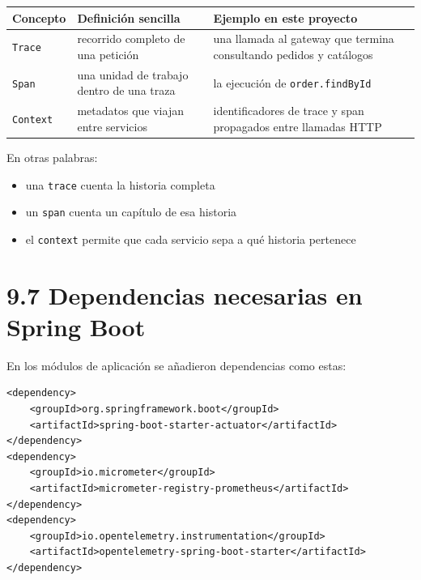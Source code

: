 \documentclass[
a4paper,
12pt]{report}
\providecommand{\tightlist}{%
  \setlength{\itemsep}{0pt}\setlength{\parskip}{0pt}}
\begin{document}
{\def\LTcaptype{table} %
\begin{longtable}[]{@{}
  >{\raggedright\arraybackslash}p{}
  >{\raggedright\arraybackslash}p{}
  >{\raggedright\arraybackslash}p{}@{}}
\toprule\noalign{}
\begin{minipage}[b]{\linewidth}\raggedright
Concepto
\end{minipage} & \begin{minipage}[b]{\linewidth}\raggedright
Definición sencilla
\end{minipage} & \begin{minipage}[b]{\linewidth}\raggedright
Ejemplo en este proyecto
\end{minipage} \\
\midrule\noalign{}
\endhead
\bottomrule\noalign{}
\endlastfoot
\texttt{Trace} & recorrido completo de una petición & una llamada al
gateway que termina consultando pedidos y catálogos \\
\texttt{Span} & una unidad de trabajo dentro de una traza & la ejecución
de \texttt{order.findById} \\
\texttt{Context} & metadatos que viajan entre servicios &
identificadores de trace y span propagados entre llamadas HTTP \\
\end{longtable}
}

En otras palabras:

\begin{itemize}
\tightlist
\item
  una \texttt{trace} cuenta la historia completa
\item
  un \texttt{span} cuenta un capítulo de esa historia
\item
  el \texttt{context} permite que cada servicio sepa a qué historia
  pertenece
\end{itemize}

\section{9.7 Dependencias necesarias en Spring
Boot}\label{dependencias-necesarias-en-spring-boot}

En los módulos de aplicación se añadieron dependencias como estas:

\begin{verbatim}
<dependency>
    <groupId>org.springframework.boot</groupId>
    <artifactId>spring-boot-starter-actuator</artifactId>
</dependency>
<dependency>
    <groupId>io.micrometer</groupId>
    <artifactId>micrometer-registry-prometheus</artifactId>
</dependency>
<dependency>
    <groupId>io.opentelemetry.instrumentation</groupId>
    <artifactId>opentelemetry-spring-boot-starter</artifactId>
</dependency>
\end{verbatim}
\end{document}
